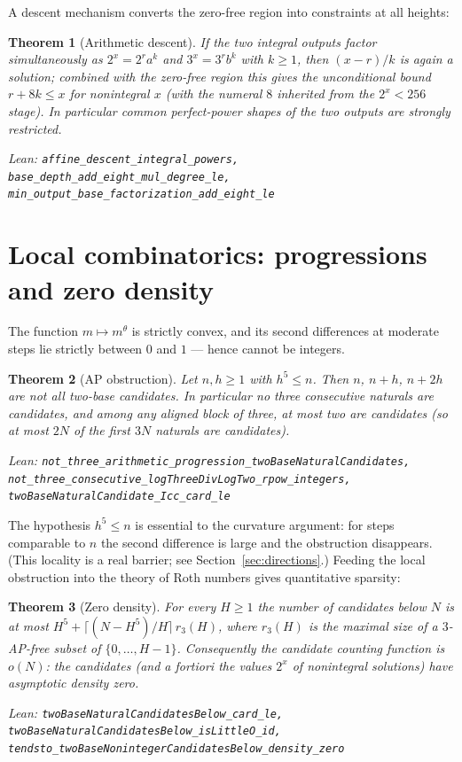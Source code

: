 \documentclass[11pt]{article}
\newtheorem{theorem}{Theorem}[section]
\theoremstyle{definition}
\theoremstyle{remark}
\newcommand{\thetaq}{\theta}
\newcommand{\lean}[1]{\par\smallskip\noindent\begingroup\footnotesize\raggedright\emph{Lean:} \texttt{#1}\par\endgroup}
\begin{document}
A descent mechanism converts the zero-free region into constraints at all heights:

\begin{theorem}[Arithmetic descent]\label{thm:descent}
If the two integral outputs factor simultaneously as $2^x = 2^r a^k$ and $3^x = 3^r b^k$
with $k\ge 1$, then $(x-r)/k$ is again a solution; combined with the zero-free region this
gives the unconditional bound $r + 8k \le x$ for nonintegral $x$ (with the numeral $8$
inherited from the $2^x<256$ stage). In particular common perfect-power shapes of the two
outputs are strongly restricted.
\lean{affine\_descent\_integral\_powers, base\_depth\_add\_eight\_mul\_degree\_le,
min\_output\_base\_factorization\_add\_eight\_le}
\end{theorem}

\section{Local combinatorics: progressions and zero density}\label{sec:ap}

The function $m\mapsto m^{\thetaq}$ is strictly convex, and its second differences at
moderate steps lie strictly between $0$ and $1$ --- hence cannot be integers.

\begin{theorem}[AP obstruction]\label{thm:ap}
Let $n,h\ge 1$ with $h^5\le n$. Then $n$, $n+h$, $n+2h$ are not all two-base candidates. In
particular no three consecutive naturals are candidates, and among any aligned block of
three, at most two are candidates (so at most $2N$ of the first $3N$ naturals are
candidates).
\lean{not\_three\_arithmetic\_progression\_twoBaseNaturalCandidates,
not\_three\_consecutive\_logThreeDivLogTwo\_rpow\_integers,
twoBaseNaturalCandidate\_Icc\_card\_le}
\end{theorem}

The hypothesis $h^5\le n$ is essential to the curvature argument: for steps comparable to
$n$ the second difference is large and the obstruction disappears. (This locality is a real
barrier; see Section~\ref{sec:directions}.) Feeding the local obstruction into the theory of
Roth numbers gives quantitative sparsity:

\begin{theorem}[Zero density]\label{thm:density}
For every $H\ge 1$ the number of candidates below $N$ is at most
$H^5+\lceil (N-H^5)/H\rceil\,r_3(H)$, where $r_3(H)$ is the maximal size of a $3$-AP-free
subset of $\{0,\dots,H-1\}$. Consequently the candidate counting function is $o(N)$: the
candidates (and \emph{a fortiori} the values $2^x$ of nonintegral solutions) have asymptotic
density zero.
\lean{twoBaseNaturalCandidatesBelow\_card\_le,
twoBaseNaturalCandidatesBelow\_isLittleO\_id,
tendsto\_twoBaseNonintegerCandidatesBelow\_density\_zero}
\end{theorem}
\end{document}

